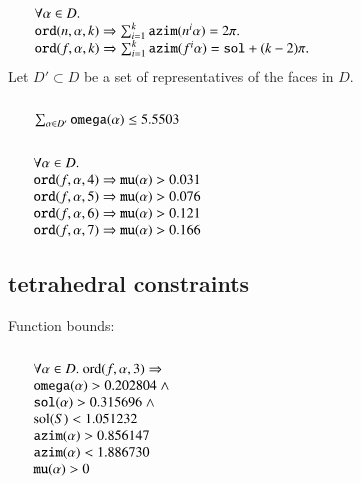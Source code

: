 $$
\begin{array}{lll}
\leftalign\\
\forall \alpha\in D.\\ 
   \optt{ord}(n,\alpha,k) \Rightarrow
   \sum_{i=1}^k \optt{azim}(n^i\alpha )  = 2\pi.\\
   \optt{ord}(f,\alpha,k) \Rightarrow
   \sum_{i=1}^k \optt{azim}(f^i\alpha ) = \optt{sol} + (k -2)\pi.\\
   \end{array}
$$
\noindent
Let $D'\subset D$ be a set of representatives of the faces in $D$.
$$
\begin{array}{lll}
\leftalign\\
\sum_{\alpha\in D'} \optt{omega}(\alpha) \le 5.5503 \\
\end{array}
$$
$$
\begin{array}{lll}
\leftalign\\
\forall \alpha\in D.\\
   \optt{ord}(f,\alpha,4) \Rightarrow
   \optt{mu}(\alpha) > 0.031 \\
   \optt{ord}(f,\alpha,5) \Rightarrow
   \optt{mu}(\alpha) > 0.076 \\
   \optt{ord}(f,\alpha,6) \Rightarrow
   \optt{mu}(\alpha) > 0.121 \\
   \optt{ord}(f,\alpha,7) \Rightarrow
   \optt{mu}(\alpha) > 0.166 \\
\end{array}
$$




\subsection{tetrahedral constraints}

\noindent
Function bounds:
$$
\begin{array}{lll}
\leftalign\\
  \forall \alpha\in D. \ \op{ord}(f,\alpha,3) 
   \Rightarrow \\ 
      \optt{omega}(\alpha) > 0.202804  \sland \\
   \optt{sol}(\alpha) > 0.315696 \sland \\
   \sol(S) < 1.051232\\
   \optt{azim}(\alpha) > 0.856147\\
   \optt{azim}(\alpha) < 1.886730\\
   \optt{mu}(\alpha) > 0
\end{array}
$$

